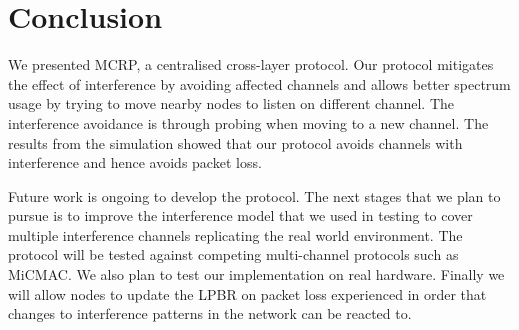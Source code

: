 \section{Conclusion}
\label{sec:conclusion}


We presented MCRP, a centralised cross-layer protocol. Our protocol mitigates the effect of interference by avoiding affected channels and allows better spectrum usage by trying to move nearby nodes to listen on different channel. The interference avoidance is through probing when moving to a new channel. The results from the simulation showed that our protocol avoids channels with interference and hence avoids packet loss.

Future work is ongoing to develop the protocol. The next stages that we plan to pursue is to improve the interference model that we used in testing to cover multiple interference channels replicating the real world environment. The protocol will be tested against competing multi-channel protocols such as MiCMAC. We also plan to test our implementation on real hardware.  Finally we will allow nodes to update the LPBR on packet loss experienced in order that changes to interference patterns in the network can be reacted to.


